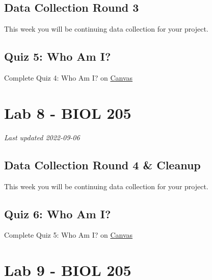 \documentclass[
]{book}
\begin{document}
\hypertarget{data-collection-round-3}{%
\chapter*{Data Collection Round 3}\label{data-collection-round-3}}

This week you will be continuing data collection for your project.

\hypertarget{quiz-5-who-am-i}{%
\chapter*{Quiz 5: Who Am I?}\label{quiz-5-who-am-i}}

Complete Quiz 4: Who Am I? on \href{https://canvas.ubc.ca/courses/113910}{Canvas}

\hypertarget{part-lab-8---biol-205}{%
\part*{Lab 8 - BIOL 205}\label{part-lab-8---biol-205}}

\emph{Last updated 2022-09-06}

\hypertarget{data-collection-round-4-cleanup}{%
\chapter*{Data Collection Round 4 \& Cleanup}\label{data-collection-round-4-cleanup}}

This week you will be continuing data collection for your project.

\hypertarget{quiz-6-who-am-i}{%
\chapter*{Quiz 6: Who Am I?}\label{quiz-6-who-am-i}}

Complete Quiz 5: Who Am I? on \href{https://canvas.ubc.ca/courses/113910}{Canvas}

\hypertarget{part-lab-9---biol-205}{%
\part*{Lab 9 - BIOL 205}\label{part-lab-9---biol-205}}
\end{document}
